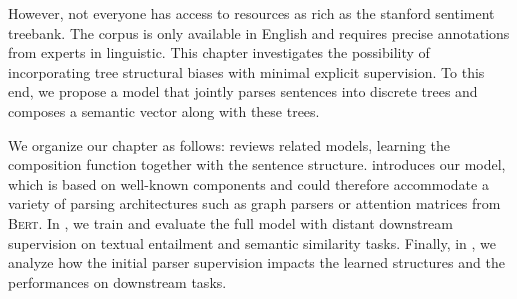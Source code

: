 However, not everyone has access to resources as rich as the stanford sentiment treebank. The corpus is only available in English and requires precise annotations from experts in linguistic. This chapter investigates the possibility of incorporating tree structural biases with minimal explicit supervision. To this end, we propose a model that jointly parses sentences into discrete trees and composes a semantic vector along with these trees.

We organize our chapter as follows:  reviews related models, learning the composition function together with the sentence structure.  introduces our model, which is based on well-known components and could therefore accommodate a variety of parsing architectures such as graph parsers or attention matrices from \textsc{Bert}. In , we train and evaluate the full model with distant downstream supervision on textual entailment and semantic similarity tasks. Finally, in , we analyze how the initial parser supervision impacts the learned structures and the performances on downstream tasks.









